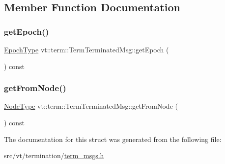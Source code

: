 \subsection{Member Function Documentation}
\mbox{\label{structvt_1_1term_1_1_term_terminated_msg_a9008729d246d7cde6ce7b5dfb2dfa204}} 
\subsubsection{\texorpdfstring{get\+Epoch()}{getEpoch()}}
{\footnotesize\ttfamily \hyperlink{namespacevt_a985a5adf291c34a3ca263b3378388236}{Epoch\+Type} vt\+::term\+::\+Term\+Terminated\+Msg\+::get\+Epoch (\begin{DoxyParamCaption}{ }\end{DoxyParamCaption}) const\hspace{0.3cm}{\ttfamily [inline]}}

\mbox{\label{structvt_1_1term_1_1_term_terminated_msg_a61ee025b8d4918e81bee601a4e7a2c3d}} 
\subsubsection{\texorpdfstring{get\+From\+Node()}{getFromNode()}}
{\footnotesize\ttfamily \hyperlink{namespacevt_a866da9d0efc19c0a1ce79e9e492f47e2}{Node\+Type} vt\+::term\+::\+Term\+Terminated\+Msg\+::get\+From\+Node (\begin{DoxyParamCaption}{ }\end{DoxyParamCaption}) const\hspace{0.3cm}{\ttfamily [inline]}}



The documentation for this struct was generated from the following file\+:\begin{DoxyCompactItemize}
\item 
src/vt/termination/\hyperlink{term__msgs_8h}{term\+\_\+msgs.\+h}\end{DoxyCompactItemize}
